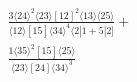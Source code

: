 \documentclass[varwidth, border=5pt]{standalone}
\begin{document}
\begin{my}
$\begin{gathered}
\scriptscriptstyle\frac{3⟨24⟩^2⟨23⟩[12]^2⟨13⟩⟨25⟩}{⟨12⟩[15]⟨34⟩^4⟨2|1+5|2]}+\\
\scriptscriptstyle\frac{1⟨35⟩^2[15]⟨25⟩}{⟨23⟩[24]⟨34⟩^3}\phantom{+}
\end{gathered}$
\end{my}
\end{document}
